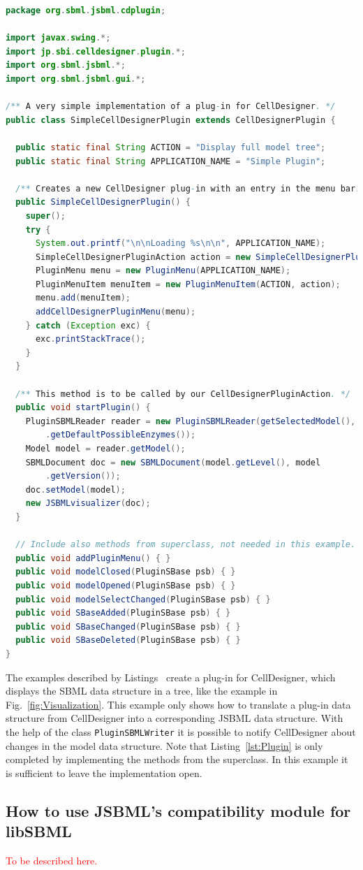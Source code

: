 \documentclass[
  BCOR12mm,
  letterpaper,
  11pt,
  headsepline,
  pointlessnumbers,
  tablecaptionabove,
  onelinecaption,
  headinclude,
  appendixprefix,
  idxtotoc,
  bibtotoc,
  twoside,
  titlepage
]{scrartcl}
\begin{document}
\begin{lstlisting}[language=Java,float,caption={A simple example for a
CellDesigner plug-in using JSBML as a communication layer},label=lst:Plugin]
package org.sbml.jsbml.cdplugin;

import javax.swing.*;
import jp.sbi.celldesigner.plugin.*;
import org.sbml.jsbml.*;
import org.sbml.jsbml.gui.*;

/** A very simple implementation of a plug-in for CellDesigner. */
public class SimpleCellDesignerPlugin extends CellDesignerPlugin {

  public static final String ACTION = "Display full model tree";
  public static final String APPLICATION_NAME = "Simple Plugin";

  /** Creates a new CellDesigner plug-in with an entry in the menu bar. */
  public SimpleCellDesignerPlugin() {
    super();
    try {
      System.out.printf("\n\nLoading %s\n\n", APPLICATION_NAME);
      SimpleCellDesignerPluginAction action = new SimpleCellDesignerPluginAction(this);
      PluginMenu menu = new PluginMenu(APPLICATION_NAME);
      PluginMenuItem menuItem = new PluginMenuItem(ACTION, action);
      menu.add(menuItem);
      addCellDesignerPluginMenu(menu);
    } catch (Exception exc) {
      exc.printStackTrace();
    }
  }

  /** This method is to be called by our CellDesignerPluginAction. */
  public void startPlugin() {
    PluginSBMLReader reader = new PluginSBMLReader(getSelectedModel(), SBO
        .getDefaultPossibleEnzymes());
    Model model = reader.getModel();
    SBMLDocument doc = new SBMLDocument(model.getLevel(), model
        .getVersion());
    doc.setModel(model);
    new JSBMLvisualizer(doc);
  }

  // Include also methods from superclass, not needed in this example.
  public void addPluginMenu() { }
  public void modelClosed(PluginSBase psb) { }
  public void modelOpened(PluginSBase psb) { }
  public void modelSelectChanged(PluginSBase psb) { }
  public void SBaseAdded(PluginSBase psb) { }
  public void SBaseChanged(PluginSBase psb) { }
  public void SBaseDeleted(PluginSBase psb) { }
}
\end{lstlisting}
The examples described by Listings~
create a plug-in for CellDesigner, which displays the SBML data structure
in a tree, like the example in Fig.~\vref{fig:Visualization}. This example only
shows how to translate a plug-in data structure
from CellDesigner into a corresponding JSBML data structure. With the help of
the class \texttt{PluginSBMLWriter} it is possible to notify CellDesigner about
changes in the model data structure. Note that Listing~\vref{lst:Plugin} is only
completed by implementing the methods from the superclass. In this example it
is sufficient to leave the implementation open.

\subsection{How to use JSBML's compatibility module for libSBML}

\textcolor{red}{To be described here.}

\clearpage



\printindex
\end{document}
